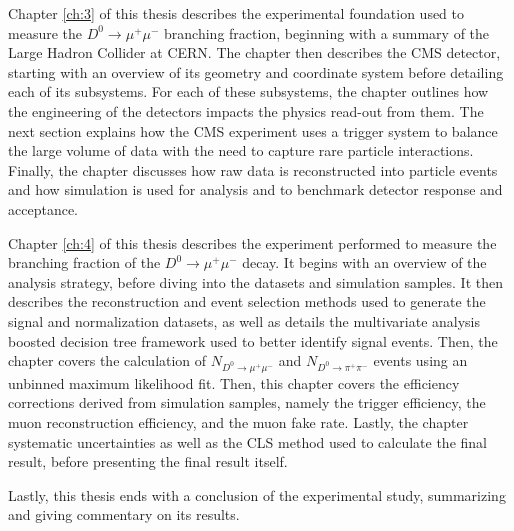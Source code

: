 Chapter \ref{ch:3} of this thesis describes the experimental foundation used to measure the $D^0 \to \mu^+ \mu^-$ branching fraction, beginning with a summary of the Large Hadron Collider at CERN. The chapter then describes the CMS detector, starting with an overview of its geometry and coordinate system before detailing each of its subsystems. For each of these subsystems, the chapter outlines how the engineering of the detectors impacts the physics read-out from them. The next section explains how the CMS experiment uses a trigger system to balance the large volume of data with the need to capture rare particle interactions. Finally, the chapter discusses how raw data is reconstructed into particle events and how simulation is used for analysis and to benchmark detector response and acceptance.

Chapter \ref{ch:4} of this thesis describes the experiment performed to measure the branching fraction of the $D^0 \to \mu^+ \mu^-$ decay. It begins with an overview of the analysis strategy, before diving into the datasets and simulation samples. It then describes the reconstruction and event selection methods used to generate the signal and normalization datasets, as well as details the multivariate analysis boosted decision tree framework used to better identify signal events. Then, the chapter covers the calculation of $N_{D^0 \to \mu^+ \mu^-}$ and $N_{D^0 \to \pi^+ \pi^-}$ events using an unbinned maximum likelihood fit. Then, this chapter covers the efficiency corrections derived from simulation samples, namely the trigger efficiency, the muon reconstruction efficiency, and the muon fake rate. Lastly, the chapter systematic uncertainties as well as the CLS method used to calculate the final result, before presenting the final result itself. 

Lastly, this thesis ends with a conclusion of the experimental study, summarizing and giving commentary on its results. 

